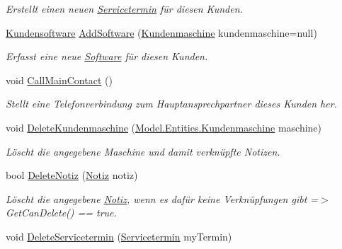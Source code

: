 \begin{DoxyCompactItemize}
\begin{DoxyCompactList}\small\item\em Erstellt einen neuen \hyperlink{class_products_1_1_model_1_1_entities_1_1_servicetermin}{Servicetermin} für diesen Kunden. \end{DoxyCompactList}\item 
\hyperlink{class_products_1_1_model_1_1_entities_1_1_kundensoftware}{Kundensoftware} \hyperlink{class_products_1_1_model_1_1_entities_1_1_kunde_a48b1cbd01541c10d17334fefe42fa4c5}{Add\+Software} (\hyperlink{class_products_1_1_model_1_1_entities_1_1_kundenmaschine}{Kundenmaschine} kundenmaschine=null)
\begin{DoxyCompactList}\small\item\em Erfasst eine neue \hyperlink{class_products_1_1_model_1_1_entities_1_1_software}{Software} für diesen Kunden. \end{DoxyCompactList}\item 
void \hyperlink{class_products_1_1_model_1_1_entities_1_1_kunde_a5b31f0f2c060f96bafb7ac7933f7098b}{Call\+Main\+Contact} ()
\begin{DoxyCompactList}\small\item\em Stellt eine Telefonverbindung zum Hauptansprechpartner dieses Kunden her. \end{DoxyCompactList}\item 
void \hyperlink{class_products_1_1_model_1_1_entities_1_1_kunde_a42a2442f7c76505077b74335762a32d5}{Delete\+Kundenmaschine} (\hyperlink{class_products_1_1_model_1_1_entities_1_1_kundenmaschine}{Model.\+Entities.\+Kundenmaschine} maschine)
\begin{DoxyCompactList}\small\item\em Löscht die angegebene Maschine und damit verknüpfte Notizen. \end{DoxyCompactList}\item 
bool \hyperlink{class_products_1_1_model_1_1_entities_1_1_kunde_aa40534199dc55d6d9422f052baec4e40}{Delete\+Notiz} (\hyperlink{class_products_1_1_model_1_1_entities_1_1_notiz}{Notiz} notiz)
\begin{DoxyCompactList}\small\item\em Löscht die angegebene \hyperlink{class_products_1_1_model_1_1_entities_1_1_notiz}{Notiz}, wenn es dafür keine Verknüpfungen gibt =$>$ Get\+Can\+Delete() == true. \end{DoxyCompactList}\item 
void \hyperlink{class_products_1_1_model_1_1_entities_1_1_kunde_a1eb7058d0fd191997ad08388fb1fc48d}{Delete\+Servicetermin} (\hyperlink{class_products_1_1_model_1_1_entities_1_1_servicetermin}{Servicetermin} my\+Termin)

\end{DoxyCompactItemize}
